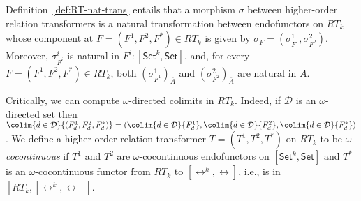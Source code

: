 \documentclass{lmcs}
\theoremstyle{plain}\newtheorem{satz}[thm]{Satz}
\newcommand{\cal}{\mathcal}
\newcommand{\set}{\mathsf{Set}}
\begin{document}
Definition~\ref{def:RT-nat-trans} entails that a morphism $\sigma$
between higher-order relation transformers is a natural transformation
between endofunctors on $RT_k$ whose component at $F = (F^1,F^2,F^*)
\in RT_k$ is given by $\sigma_F = (\sigma^1_{F^1}, \sigma^2_{F^2})$.
Moreover, $\sigma^i_{F^i}$ is natural in $F^i : [\set^k,\set]$, and,
for every $F = (F^1,F^2,F^*) \in RT_k$, both
$(\sigma^1_{F^1})_{\overline{A}}$ and
$(\sigma^2_{F^2})_{\overline{A}}$ are natural in $\overline{A}$.

Critically, we can compute $\omega$-directed colimits in
$RT_k$. Indeed, if $\cal D$ is an $\omega$-directed set then $\colim{d
  \in {\cal D}}{(F^1_d, F^2_d,F^*_d)} = (\colim{d \in {\cal
    D}}{F^1_d}, \colim{d \in {\cal D}}{F^2_d}, \colim{d \in {\cal
    D}}{F^*_d})$.  We define a higher-order relation transformer $T =
(T^1,T^2,T^*)$ on $RT_k$ to be {\em $\omega$-cocontinuous} if $T^1$
and $T^2$ are $\omega$-cocontinuous endofunctors on $[\set^k,\set]$
and $T^*$ is an $\omega$-cocontinuous functor from $RT_k$ to
$[\rel^k,\rel]$, i.e., is in $[RT_k,[\rel^k,\rel]]$.
%
\end{document}

